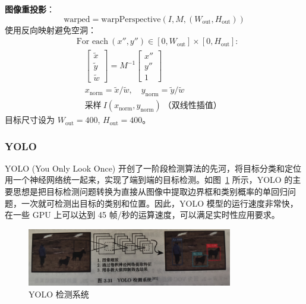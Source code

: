 \documentclass[12pt, a4paper]{article}
\begin{document}
\textbf{图像重投影}：
\begin{equation}
\text{warped} = \text{warpPerspective}(I, M, (W_{\text{out}}, H_{\text{out}}))
\end{equation}
使用反向映射避免空洞：
\begin{align}
&\text{For each}\ (x'', y'') \in [0, W_{\text{out}}] \times [0, H_{\text{out}}]: \nonumber \\
&\quad \begin{bmatrix} \tilde{x} \\ \tilde{y} \\ \tilde{w} \end{bmatrix} = M^{-1} \begin{bmatrix} x'' \\ y'' \\ 1 \end{bmatrix} \\
&\quad x_{\text{norm}} = \tilde{x}/\tilde{w}, \quad y_{\text{norm}} = \tilde{y}/\tilde{w} \\
&\quad \text{采样}\ I(x_{\text{norm}}, y_{\text{norm}})\ \text{（双线性插值）}
\end{align}
目标尺寸设为 $W_{\text{out}} = 400$, $H_{\text{out}} = 400$。
\subsubsection{YOLO}\label{subsubsec:yolo}
YOLO (You Only Look Once) 开创了一阶段检测算法的先河，将目标分类和定位用一个神经网络统一起来，实现了端到端的目标检测。如图~\ref{fig:yolo_system} 所示，YOLO 的主要思想是把目标检测问题转换为直接从图像中提取边界框和类别概率的单回归问题，一次就可检测出目标的类别和位置。因此，YOLO 模型的运行速度非常快，在一些 GPU 上可以达到 45 帧/秒的运算速度，可以满足实时性应用要求。

\begin{figure}[htbp]
    \centering
    \includegraphics[width=0.8\textwidth]{image/yolojiancexitong.jpg} %
    \caption{YOLO 检测系统~}
    \label{fig:yolo_system}
\end{figure}
\end{document}
